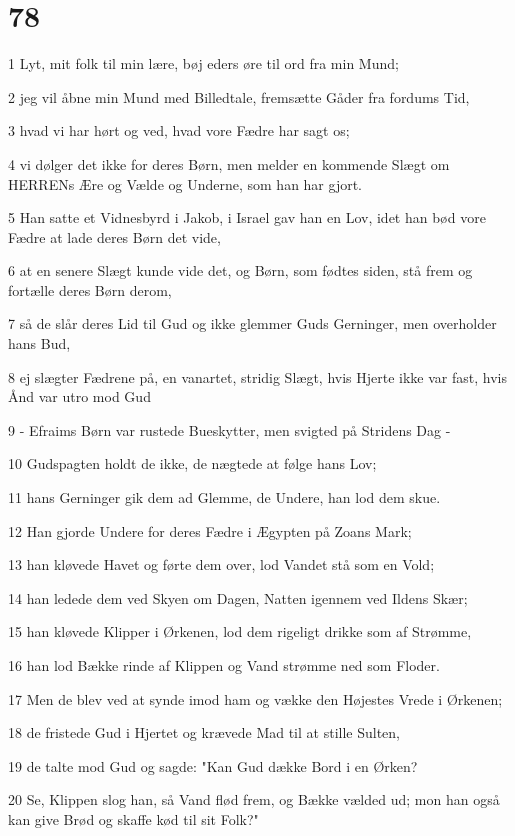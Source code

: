 \chapter{78}

\par 1 Lyt, mit folk til min lære, bøj eders øre til ord fra min Mund;
\par 2 jeg vil åbne min Mund med Billedtale, fremsætte Gåder fra fordums Tid,
\par 3 hvad vi har hørt og ved, hvad vore Fædre har sagt os;
\par 4 vi dølger det ikke for deres Børn, men melder en kommende Slægt om HERRENs Ære og Vælde og Underne, som han har gjort.
\par 5 Han satte et Vidnesbyrd i Jakob, i Israel gav han en Lov, idet han bød vore Fædre at lade deres Børn det vide,
\par 6 at en senere Slægt kunde vide det, og Børn, som fødtes siden, stå frem og fortælle deres Børn derom,
\par 7 så de slår deres Lid til Gud og ikke glemmer Guds Gerninger, men overholder hans Bud,
\par 8 ej slægter Fædrene på, en vanartet, stridig Slægt, hvis Hjerte ikke var fast, hvis Ånd var utro mod Gud
\par 9 - Efraims Børn var rustede Bueskytter, men svigted på Stridens Dag -
\par 10 Gudspagten holdt de ikke, de nægtede at følge hans Lov;
\par 11 hans Gerninger gik dem ad Glemme, de Undere, han lod dem skue.
\par 12 Han gjorde Undere for deres Fædre i Ægypten på Zoans Mark;
\par 13 han kløvede Havet og førte dem over, lod Vandet stå som en Vold;
\par 14 han ledede dem ved Skyen om Dagen, Natten igennem ved Ildens Skær;
\par 15 han kløvede Klipper i Ørkenen, lod dem rigeligt drikke som af Strømme,
\par 16 han lod Bække rinde af Klippen og Vand strømme ned som Floder.
\par 17 Men de blev ved at synde imod ham og vække den Højestes Vrede i Ørkenen;
\par 18 de fristede Gud i Hjertet og krævede Mad til at stille Sulten,
\par 19 de talte mod Gud og sagde: "Kan Gud dække Bord i en Ørken?
\par 20 Se, Klippen slog han, så Vand flød frem, og Bække vælded ud; mon han også kan give Brød og skaffe kød til sit Folk?"
